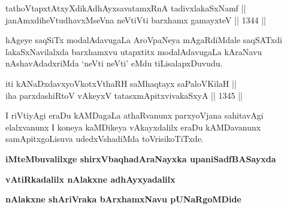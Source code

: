 \begin{shl}
tathoVtapxtAtxyXdikAdhAyxsavatamxRnA tadivxlakaSxNamf || \\
janAmxdiheVtudhavxMseVna neVtiVti barxhamx gamayxteV \hfill || 1344 ||  
\end{shl}

\begin{artha}
hAgeye saqSiTx modalAdavugaLa AroVpaNeya mAgaRdiMdale saqSATxdi lakaSxNavilalxda barxhamxvu utapxtitx modalAdavugaLa kAraNavu nAshavAdadxriMda `neVti neVti' eMdu tiLisalapxDuvudu.
\end{artha}


\begin{shl}
iti kANaDxdavxyoVkotxV\s thaRH saMhaqtayx saPaloV\s KilaH || \\
iha parxdashiRtoV vAkeyxV tatasxmApitxvivakaSxyA \hfill || 1345 ||  
\end{shl}

\begin{artha}
I riVtiyAgi eraDu kAMDagaLa athaRvanunx parxyoVjana sahitavAgi elalxvanunx I koneya kaMDikeya vAkayxdalilx eraDu kAMDavanunx samApitxgoLisuva udedxVshadiMda toVrisikoTiTxde.
\end{artha}

\bigskip
\begin{center}
{\bf iMteMbuvalilxge shirxVbaqhadAraNayxka upaniSadfBASayxda}

\smallskip
{\bf vAtiRkadalilx nAlakxne adhAyxyadalilx}

\smallskip
{\bf nAlakxne shAriVraka bArxhamxNavu pUNaRgoMDide}
\end{center}
\bigskip
